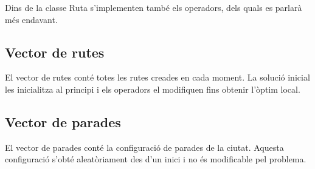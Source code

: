 Dins de la classe Ruta s'implementen també els operadors, dels quals es parlarà més endavant.

\subsection{Vector de rutes} %

El vector de rutes conté totes les rutes creades en cada moment. La solució inicial les inicialitza al principi i els operadors el modifiquen fins obtenir l'òptim local.

\subsection{Vector de parades} %

El vector de parades conté la configuració de parades de la ciutat. Aquesta configuració s'obté aleatòriament des d'un inici i no és modificable pel problema.

